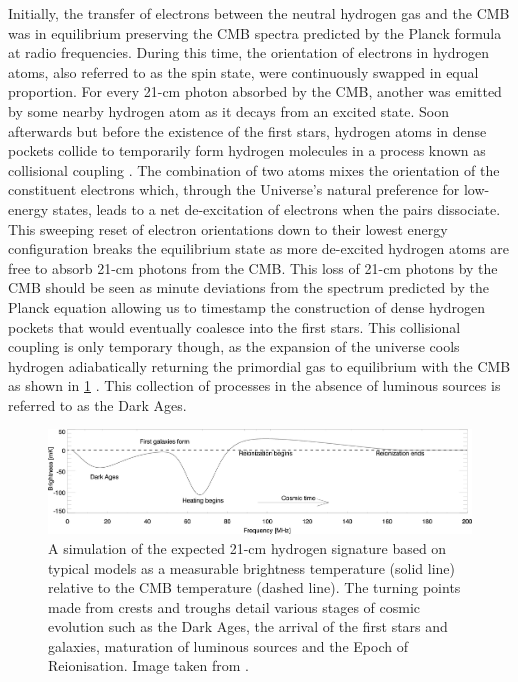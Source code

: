 Initially, the transfer of electrons between the neutral hydrogen gas and the CMB was in equilibrium preserving the CMB spectra predicted by the Planck formula at radio frequencies. During this time, the orientation of electrons in hydrogen atoms, also referred to as the spin state, were continuously swapped in equal proportion. For every 21-cm photon absorbed by the CMB, another was emitted by some nearby hydrogen atom as it decays from an excited state. Soon afterwards but before the existence of the first stars, hydrogen atoms in dense pockets collide to temporarily form hydrogen molecules in a process known as collisional coupling \citep{21in21}. The combination of two atoms mixes the orientation of the constituent electrons which, through the Universe’s natural preference for low-energy states, leads to a net de-excitation of electrons when the pairs dissociate. This sweeping reset of electron orientations down to their lowest energy configuration breaks the equilibrium state as more de-excited hydrogen atoms are free to absorb 21-cm photons from the CMB. This loss of 21-cm photons by the CMB should be seen as minute deviations from the spectrum predicted by the Planck equation allowing us to timestamp the construction of dense hydrogen pockets that would eventually coalesce into the first stars. This collisional coupling is only temporary though, as the expansion of the universe cools hydrogen adiabatically returning the primordial gas to equilibrium with the CMB as shown in \cref{fig:reionisation_hist} \citep{21in21}. This collection of processes in the absence of luminous sources is referred to as the Dark Ages.
\begin{figure}
    \centering
    \includegraphics[width=\textwidth]{21cm_signal}
    \caption{A simulation of the expected 21-cm hydrogen signature based on typical models as a measurable brightness temperature (solid line) relative to the CMB temperature (dashed line). The turning points made from crests and troughs detail various stages of cosmic evolution such as the Dark Ages, the arrival of the first stars and galaxies, maturation of luminous sources and the Epoch of Reionisation. Image taken from \citet{cosmic_signature}.}
    \label{fig:reionisation_hist}
\end{figure}

